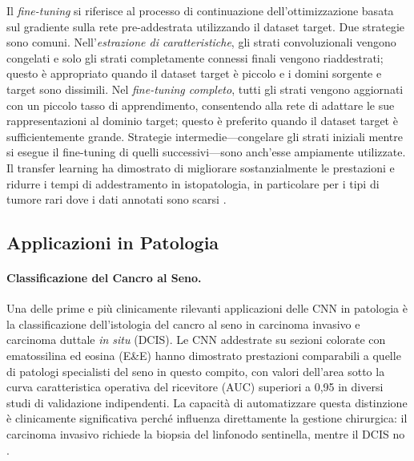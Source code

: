 Il \emph{fine-tuning} si riferisce al processo di continuazione dell'ottimizzazione basata sul gradiente sulla rete pre-addestrata utilizzando il dataset target. Due strategie sono comuni. Nell'\emph{estrazione di caratteristiche}, gli strati convoluzionali vengono congelati e solo gli strati completamente connessi finali vengono riaddestrati; questo è appropriato quando il dataset target è piccolo e i domini sorgente e target sono dissimili. Nel \emph{fine-tuning completo}, tutti gli strati vengono aggiornati con un piccolo tasso di apprendimento, consentendo alla rete di adattare le sue rappresentazioni al dominio target; questo è preferito quando il dataset target è sufficientemente grande. Strategie intermedie---congelare gli strati iniziali mentre si esegue il fine-tuning di quelli successivi---sono anch'esse ampiamente utilizzate. Il transfer learning ha dimostrato di migliorare sostanzialmente le prestazioni e ridurre i tempi di addestramento in istopatologia, in particolare per i tipi di tumore rari dove i dati annotati sono scarsi \cite{coudray2018}.

\subsection{Applicazioni in Patologia}

\paragraph{Classificazione del Cancro al Seno.}
Una delle prime e più clinicamente rilevanti applicazioni delle CNN in patologia è la classificazione dell'istologia del cancro al seno in carcinoma invasivo e carcinoma duttale \emph{in situ} (DCIS). Le CNN addestrate su sezioni colorate con ematossilina ed eosina (E\&E) hanno dimostrato prestazioni comparabili a quelle di patologi specialisti del seno in questo compito, con valori dell'area sotto la curva caratteristica operativa del ricevitore (AUC) superiori a 0,95 in diversi studi di validazione indipendenti. La capacità di automatizzare questa distinzione è clinicamente significativa perché influenza direttamente la gestione chirurgica: il carcinoma invasivo richiede la biopsia del linfonodo sentinella, mentre il DCIS no \cite{coudray2018}.


